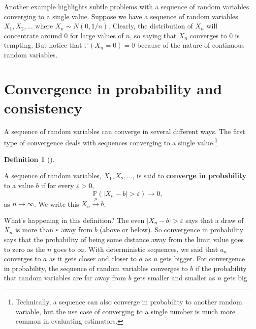 \documentclass[
  letterpaper,
  DIV=11,
  numbers=noendperiod]{scrreprt}
\renewcommand{\P}{\mathbb{P}}
\newcommand{\inprob}{\overset{p}{\to}}
\theoremstyle{definition}
\theoremstyle{definition}
\newtheorem{definition}{Definition}[chapter]
\theoremstyle{plain}
\theoremstyle{remark}
\begin{document}
Another example highlights subtle problems with a sequence of random
variables converging to a single value. Suppose we have a sequence of
random variables \(X_1, X_2, \ldots\) where \(X_n \sim N(0, 1/n)\).
Clearly, the distribution of \(X_n\) will concentrate around 0 for large
values of \(n\), so saying that \(X_n\) converges to 0 is tempting. But
notice that \(\P(X_n = 0) = 0\) because of the nature of continuous
random variables.

\hypertarget{convergence-in-probability-and-consistency}{%
\section{Convergence in probability and
consistency}\label{convergence-in-probability-and-consistency}}

A sequence of random variables can converge in several different ways.
The first type of convergence deals with sequences converging to a
single value.\footnote{Technically, a sequence can also converge in
  probability to another random variable, but the use case of converging
  to a single number is much more common in evaluating estimators.}

\begin{definition}[]\protect\hypertarget{def-inprob}{}\label{def-inprob}

A sequence of random variables, \(X_1, X_2, \ldots\), is said to
\textbf{converge in probability} to a value \(b\) if for every
\(\varepsilon > 0\), \[
\P(|X_n - b| > \varepsilon) \rightarrow 0,
\] as \(n\rightarrow \infty\). We write this \(X_n \inprob b\).

\end{definition}

What's happening in this definition? The even
\(|X_n - b| > \varepsilon\) says that a draw of \(X_n\) is more than
\(\varepsilon\) away from \(b\) (above or below). So convergence in
probability says that the probability of being some distance away from
the limit value goes to zero as the \(n\) goes to \(\infty\). With
deterministic sequences, we said that \(a_n\) converges to \(a\) as it
gets closer and closer to \(a\) as \(n\) gets bigger. For convergence in
probability, the sequence of random variables converges to \(b\) if the
probability that random variables are far away from \(b\) gets smaller
and smaller as \(n\) gets big.
\end{document}

